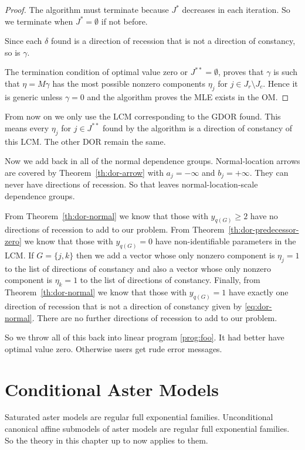 \begin{proof}
The algorithm must terminate because $J^{*}$ decreases in each iteration.
So we terminate when $J^{*} = \emptyset$ if not before.

Since each $\delta$ found is a direction of recession that is not
a direction of constancy, so is $\gamma$.

The termination condition of optimal value zero or $J^{{*}{*}} = \emptyset$,
proves that $\gamma$ is such that $\eta = M \gamma$ has the most possible
nonzero components $\eta_j$ for $j \in J_r \setminus J_c$.  Hence it
is generic unless $\gamma = 0$ and the algorithm proves the MLE exists
in the OM.
\end{proof}

From now on we only use the LCM corresponding to the GDOR found.
This means every $\eta_j$ for $j \in J^{{*}{*}}$ found by the algorithm
is a direction of constancy of this LCM.  The other DOR remain the same.

Now we add back in all of the normal dependence groups.
Normal-location arrows are covered by Theorem~\ref{th:dor-arrow}
with $a_j = - \infty$ and $b_j = + \infty$.  They can never have
directions of recession.  So that leaves normal-location-scale dependence
groups.

From Theorem~\ref{th:dor-normal} we know that those with $y_{q(G)} \ge 2$
have no directions of recession to add to our problem.
From Theorem~\ref{th:dor-predecessor-zero} we know that
those with $y_{q(G)} = 0$ have non-identifiable parameters in the LCM.
If $G = \{ j, k \}$ then we add a vector whose only nonzero component
is $\eta_j = 1$ to the list of directions of constancy and also a vector
whose only nonzero component
is $\eta_k = 1$ to the list of directions of constancy.
Finally, from Theorem~\ref{th:dor-normal} we know that those
with $y_{q(G)} = 1$ have exactly one direction of recession that is not
a direction of constancy given by \eqref{eq:dor-normal}.
There are no further directions of recession to add to our problem.

So we throw all of this back into linear program \eqref{prog:foo}.
It had better have optimal value zero.
Otherwise users get rude error messages.

\section{Conditional Aster Models}

Saturated aster models are regular full exponential families.
Unconditional canonical affine submodels of aster models are
regular full exponential families.
So the theory in this chapter up to now applies to them.

